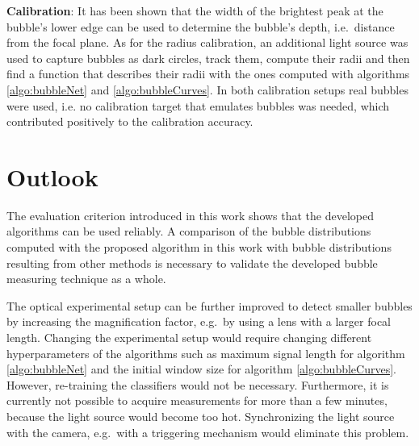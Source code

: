 \textbf{Calibration}: It has been shown that the width of the brightest peak at the bubble's lower edge can be used to determine the bubble's depth, i.e.\ distance from the focal plane. As for the radius calibration, an additional light source was used to capture bubbles as dark circles, track them, compute their radii and then find a function that describes their radii with the ones computed with algorithms \ref{algo:bubbleNet} and \ref{algo:bubbleCurves}. In both calibration setups real bubbles were used, i.e. no calibration target that emulates bubbles was needed, which contributed positively to the calibration accuracy. 

\section{Outlook}
The evaluation criterion introduced in this work shows that the developed algorithms can be used reliably. A comparison of the bubble distributions computed with the proposed algorithm in this work with bubble distributions resulting from other methods is necessary to validate the developed bubble measuring technique as a whole. 

The optical experimental setup can be further improved to detect smaller bubbles by increasing the magnification factor, e.g.\ by using a lens with a larger focal length. Changing the experimental setup would require changing different hyperparameters of the algorithms such as maximum signal length for algorithm \ref{algo:bubbleNet} and the initial window size for algorithm \ref{algo:bubbleCurves}. However, re-training the classifiers would not be necessary. Furthermore, it is currently not possible to acquire measurements for more than a few minutes, because the light source would become too hot. Synchronizing the light source with the camera, e.g.\ with a triggering mechanism would eliminate this problem. 